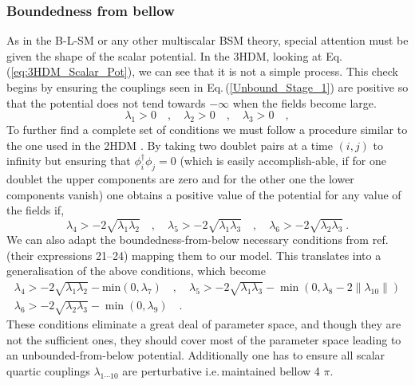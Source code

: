 \documentclass[10pt]{report}
\begin{document}
\subsubsection{Boundedness from bellow}

As in the B-L-SM or any other multiscalar BSM theory, special attention must be given the shape of the scalar potential. 
%
In the 3HDM, looking at Eq.\,(\ref{eq:3HDM_Scalar_Pot}), we can see that it is not a simple process. This check begins by ensuring the couplings seen in Eq.\,(\ref{Unbound_Stage_1}) are positive so that the potential does not tend towards $-\infty$ when the fields become large. 
%
\begin{equation}
\label{Unbound_Stage_1}
\lambda_1 > 0  \quad , \quad \lambda_2 > 0 \quad , \quad \lambda_3 > 0 \quad , 
\end{equation}
%
To further find a complete set of conditions we must follow a procedure similar to the one used in the 2HDM \cite{Branco_1996}.
%
By taking two doublet pairs at a time $(i, j)$ to infinity but ensuring that $\phi_i^\dagger \phi_j = 0$ (which is easily accomplish-able, if for one doublet the upper components are zero and for the other one the lower components vanish) one obtains a positive value of the potential for any value of the fields if,
%
\begin{equation}
\lambda_4 > -2 \sqrt{\lambda_1 \lambda_2} \quad , \quad \lambda_5 > -2 \sqrt{\lambda_1 \lambda_3} \quad , \quad \lambda_6 > -2 \sqrt{\lambda_2 \lambda_3} \ .
\end{equation}
%
We can also adapt the boundedness-from-below necessary conditions from ref. \cite{Moretti_2015} (their expressions 21–24) mapping them to our model.
%
This translates into a generalisation of the above conditions, which become
%
\begin{equation}
\begin{gathered}
\lambda_4 > - 2 \sqrt{\lambda_1 \lambda_2} - \text{min}(0,\lambda_7) \quad , \quad  \lambda_5 > -2 \sqrt{\lambda_1 \lambda_3} - \min(0,\lambda_8 - 2\|\lambda_{10}\|)  \\
\lambda_6 > - 2 \sqrt{\lambda_2 \lambda_3} - \min(0,\lambda_9) \quad . 
\end{gathered} 
\end{equation}
%
These conditions eliminate a great deal of parameter space, and though they are not the sufficient ones, they should cover most of the parameter space leading to an unbounded-from-below potential.
% 
Additionally one has to ensure all scalar quartic couplings $\lambda_{1\cdots10}$ are perturbative i.e.\,maintained bellow 4 $\pi$.
\end{document}
